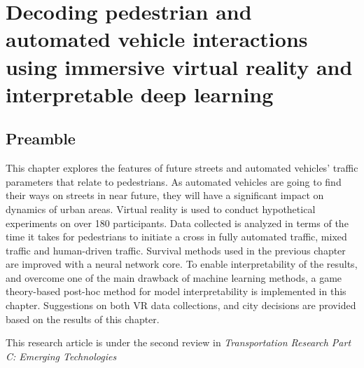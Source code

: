 \chapter{Decoding pedestrian and automated vehicle interactions using immersive virtual reality and interpretable deep learning}
\label{chap4}
\thispagestyle{empty}

\section*{Preamble}
This chapter explores the features of future streets and automated vehicles' traffic parameters that relate to pedestrians. As automated vehicles are going to find their ways on streets in near future, they will have a significant impact on dynamics of urban areas. Virtual reality is used to conduct hypothetical experiments on over 180 participants. Data collected is analyzed in terms of the time it takes for pedestrians to initiate a cross in fully automated traffic, mixed traffic and human-driven traffic. Survival methods used in the previous chapter are improved with a neural network core. To enable interpretability of the results, and overcome one of the main drawback of machine learning methods, a game theory-based post-hoc method for model interpretability is implemented in this chapter. Suggestions on both VR data collections, and city decisions are provided based on the results of this chapter. 

\vspace{1em}
\noindent
This research article is under the second review in \textit{Transportation Research Part C: Emerging Technologies}
\vspace{1em}

\clearpage

